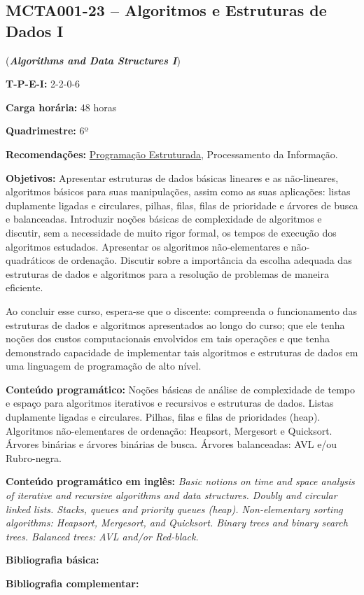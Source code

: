 \documentclass[class=article, crop=false]{standalone}
\begin{document}
\subsection*{MCTA001-23 -- Algoritmos e Estruturas de Dados I}
\label{disc:aedI}

(\textbf{\textit{Algorithms and Data Structures I}})

\begin{center}
    \begin{minipage}{0.85\textwidth}
        \textbf{T-P-E-I:} 2-2-0-6
        
        \textbf{Carga horária:} 48 horas
        
        \textbf{Quadrimestre:} 6º
        
        \textbf{Recomendações:} 
        \hyperref[disc:pe]{Programação Estruturada},
        Processamento da Informação.
    \end{minipage}
\end{center}

\textbf{Objetivos:}
Apresentar estruturas de dados básicas lineares e as não-lineares, algoritmos
básicos para suas manipulações, assim como as suas aplicações: listas
duplamente ligadas e circulares, pilhas, filas, filas de prioridade e árvores
de busca e balanceadas. Introduzir noções básicas de complexidade de algoritmos
e discutir, sem a necessidade de muito rigor formal, os tempos de execução dos
algoritmos estudados. Apresentar os algoritmos não-elementares e
não-quadráticos de ordenação. Discutir sobre a importância da escolha adequada
das estruturas de dados e algoritmos para a resolução de problemas de maneira
eficiente.

Ao concluir esse curso, espera-se que o discente: compreenda o funcionamento
das estruturas de dados e algoritmos apresentados ao longo do curso; que ele
tenha noções dos custos computacionais envolvidos em tais operações e que tenha
demonstrado capacidade de implementar tais algoritmos e estruturas de dados em
uma linguagem de programação de alto nível.

\textbf{Conteúdo programático:}
Noções básicas de análise de complexidade de tempo e espaço para algoritmos
iterativos e recursivos e estruturas de dados.
Listas duplamente ligadas e circulares.
Pilhas, filas e filas de prioridades (heap).
Algoritmos não-elementares de ordenação: Heapsort, Mergesort e Quicksort.
Árvores binárias e árvores binárias de busca.
Árvores balanceadas: AVL e/ou Rubro-negra. 

\textbf{Conteúdo programático em inglês:}
\textit{Basic notions on time and space analysis of iterative and recursive
algorithms and data structures.
Doubly and circular linked lists.
Stacks, queues and priority queues (heap).
Non-elementary sorting algorithms: Heapsort, Mergesort, and Quicksort.
Binary trees and binary search trees.
Balanced trees: AVL and/or Red-black.}

\newrefsection
\textbf{Bibliografia básica:}
\nocite{1998-sedgewick, 2010-szwarcfiter-markenzon, 2012-cormen-etal}
\printbibliography

\newrefsection
\textbf{Bibliografia complementar:}
\nocite{2007-ziviani, 1995-tenenbaum-etal, 1997-schildt, 2009-feofiloff, 2011-sedgewick-wayne}
\printbibliography
\end{document}
